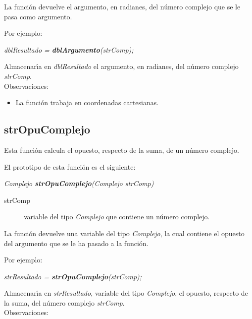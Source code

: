 La funci\'on devuelve el argumento, en radianes, del n\'umero complejo que se
le pasa como argumento.\newline

Por ejemplo:

\begin{center}
\emph{dblResultado = \textbf{dblArgumento}(strComp);}
\end{center}

Almacenar\'{\i}a en \emph{dblResultado} el argumento, en radianes, del
n\'umero complejo \emph{strComp}.\\

Observaciones:

\begin{itemize}
\item La funci\'on trabaja en coordenadas cartesianas.
\end{itemize}

\subsection{strOpuComplejo}
Esta funci\'on calcula el opuesto, respecto de la suma, de un 
n\'umero complejo.\newline

El prototipo de esta funci\'on es el siguiente:

\begin{center}
\emph{Complejo \textbf{strOpuComplejo}(Complejo strComp)}
\end{center}

\begin{description}
\item[strComp] variable del tipo \emph{Complejo} que contiene un n\'umero 
complejo.
\end{description}

La funci\'on devuelve una variable del tipo \emph{Complejo}, la cual contiene
el opuesto del argumento que se le ha pasado a la funci\'on.\newline

Por ejemplo:

\begin{center}
\emph{strResultado = \textbf{strOpuComplejo}(strComp);}
\end{center}

Almacenar\'{\i}a en \emph{strResultado}, variable del tipo \emph{Complejo}, el
opuesto, respecto de la suma, del n\'umero complejo \emph{strComp}.\\

Observaciones:


